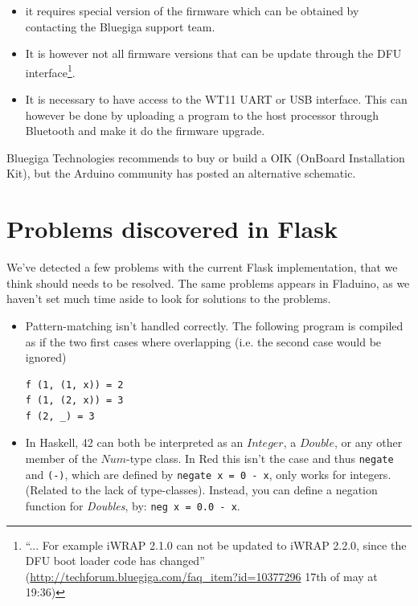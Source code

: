 \documentclass[a4paper, oneside, final]{memoir}
\begin{document}
\begin{itemize}
\item it requires special version of the firmware which can be obtained by
  contacting the Bluegiga support team.

\item It is however not all firmware versions that can be update through the DFU
  interface\footnote{``... For example iWRAP 2.1.0 can not be updated to iWRAP
    2.2.0, since the DFU boot loader code has changed''
    (\url{http://techforum.bluegiga.com/faq_item?id=10377296} 17th of may at
    19:36)}.

\item It is necessary to have access to the WT11 UART or USB
  interface. This can however be done by uploading a program to the host
  processor through Bluetooth and make it do the firmware upgrade.
\end{itemize}

Bluegiga Technologies recommends to buy or build\cite{oik_chematic} a OIK
(OnBoard Installation Kit), but the Arduino community has posted an
alternative schematic\cite{oik_chematic_arduino}.


\chapter{Problems discovered in Flask }
We've detected a few problems with the current Flask implementation,
that we think should needs to be resolved. The same problems appears
in Fladuino, as we haven't set much time aside to look for solutions
to the problems.

\begin{itemize}
\item Pattern-matching isn't handled correctly. The following program
  is compiled as if the two first cases where overlapping (i.e. the
  second case would be ignored)
\begin{verbatim}
f (1, (1, x)) = 2
f (1, (2, x)) = 3
f (2, _) = 3
\end{verbatim}

\item In Haskell, 42 can both be interpreted as an $Integer$, a
  $Double$, or any other member of the $Num$-type class. In Red this
  isn't the case and thus \texttt{negate} and \texttt{(-)}, which
  are defined by \verb|negate x = 0 - x|, only works for
  integers.(Related to the lack of type-classes). Instead, you can
  define a negation function for \textit{Doubles}, by: \verb|neg x = 0.0 - x|.
\end{itemize}
\end{document}
